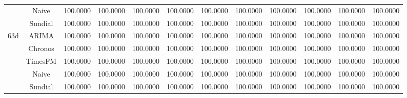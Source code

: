 \begin{table}[H]
{\begin{tabular}{cccccccccccc}
 & Naive & 100.0000 & 100.0000 & 100.0000 & 100.0000 & 100.0000 & 100.0000 & 100.0000 & 100.0000 & 100.0000 & 100.0000 \\
 & Sundial & 100.0000 & 100.0000 & 100.0000 & 100.0000 & 100.0000 & 100.0000 & 100.0000 & 100.0000 & 100.0000 & 100.0000 \\
\midrule
\multirow[c]{5}{*}{63d} & ARIMA & 100.0000 & 100.0000 & 100.0000 & 100.0000 & 100.0000 & 100.0000 & 100.0000 & 100.0000 & 100.0000 & 100.0000 \\
 & Chronos & 100.0000 & 100.0000 & 100.0000 & 100.0000 & 100.0000 & 100.0000 & 100.0000 & 100.0000 & 100.0000 & 100.0000 \\
 & TimesFM & 100.0000 & 100.0000 & 100.0000 & 100.0000 & 100.0000 & 100.0000 & 100.0000 & 100.0000 & 100.0000 & 100.0000 \\
 & Naive & 100.0000 & 100.0000 & 100.0000 & 100.0000 & 100.0000 & 100.0000 & 100.0000 & 100.0000 & 100.0000 & 100.0000 \\
 & Sundial & 100.0000 & 100.0000 & 100.0000 & 100.0000 & 100.0000 & 100.0000 & 100.0000 & 100.0000 & 100.0000 & 100.0000 \\
\bottomrule
\end{tabular}

 }
\end{table}